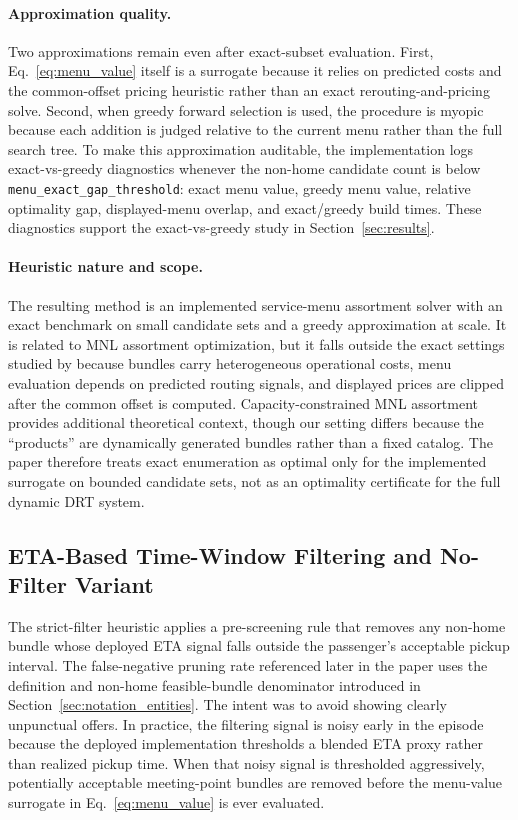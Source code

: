 \paragraph{Approximation quality.} Two approximations remain even after exact-subset evaluation. First, Eq.~\ref{eq:menu_value} itself is a surrogate because it relies on predicted costs and the common-offset pricing heuristic rather than an exact rerouting-and-pricing solve. Second, when greedy forward selection is used, the procedure is myopic because each addition is judged relative to the current menu rather than the full search tree. To make this approximation auditable, the implementation logs exact-vs-greedy diagnostics whenever the non-home candidate count is below \texttt{menu\_exact\_gap\_threshold}: exact menu value, greedy menu value, relative optimality gap, displayed-menu overlap, and exact/greedy build times. These diagnostics support the exact-vs-greedy study in Section~\ref{sec:results}.

\paragraph{Heuristic nature and scope.} The resulting method is an implemented service-menu assortment solver with an exact benchmark on small candidate sets and a greedy approximation at scale. It is related to MNL assortment optimization, but it falls outside the exact settings studied by \citet{wang2012} because bundles carry heterogeneous operational costs, menu evaluation depends on predicted routing signals, and displayed prices are clipped after the common offset is computed. Capacity-constrained MNL assortment \citep{sumida2010capacity} provides additional theoretical context, though our setting differs because the ``products'' are dynamically generated bundles rather than a fixed catalog. The paper therefore treats exact enumeration as optimal only for the implemented surrogate on bounded candidate sets, not as an optimality certificate for the full dynamic DRT system.

\subsection{ETA-Based Time-Window Filtering and No-Filter Variant}
\label{sec:filtering}

The strict-filter heuristic applies a pre-screening rule that removes any non-home bundle whose deployed ETA signal falls outside the passenger's acceptable pickup interval. The false-negative pruning rate referenced later in the paper uses the definition and non-home feasible-bundle denominator introduced in Section~\ref{sec:notation_entities}. The intent was to avoid showing clearly unpunctual offers. In practice, the filtering signal is noisy early in the episode because the deployed implementation thresholds a blended ETA proxy rather than realized pickup time. When that noisy signal is thresholded aggressively, potentially acceptable meeting-point bundles are removed before the menu-value surrogate in Eq.~\ref{eq:menu_value} is ever evaluated.

